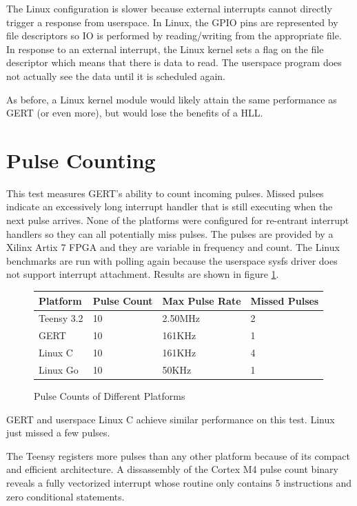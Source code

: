 The Linux configuration is slower because external interrupts cannot directly trigger a response
from userspace. In Linux, the GPIO pins are represented by file descriptors so
IO is performed by reading/writing from the appropriate file. In response to an external interrupt,
the Linux kernel sets a flag on the file descriptor which means that there is data to read. The userspace
program does not actually see the data until it is scheduled again.

As before, a Linux kernel module would likely attain the same performance as GERT
(or even more), but would lose the benefits of a HLL.


\section{Pulse Counting}\label{sec:pulse_count}
This test measures GERT's ability to count incoming pulses. Missed pulses
indicate an excessively long interrupt handler that is still executing when the next
pulse arrives. None of the platforms were configured for re-entrant interrupt handlers
so they can all potentially miss pulses.
The pulses are provided by a Xilinx Artix 7 FPGA and they are variable in
frequency and count. The Linux benchmarks are run with polling again because the
userspace sysfs driver does not support interrupt attachment.
Results are shown in figure \ref{fig:counter}.


\begin{figure} [h]
\begin{center}
  \begin{tabular}{ | l | l | l | l |}
    \hline
    Platform & Pulse Count & Max Pulse Rate & Missed Pulses \\ \hline
    Teensy 3.2 & 10 & 2.50MHz & 2 \\ \hline
    GERT & 10 & 161KHz & 1 \\ \hline
    Linux C & 10 & 161KHz & 4 \\ \hline
    Linux Go & 10 & 50KHz & 1 \\
    \hline
  \end{tabular}
\end{center}
  \caption{Pulse Counts of Different Platforms}  \label{fig:counter}
\end{figure}

GERT and userspace Linux C achieve similar performance on this test.
Linux just missed a few pulses.

The Teensy registers more pulses than any other platform because of its
compact and efficient architecture. A dissassembly of the Cortex M4 pulse count binary
reveals a fully vectorized interrupt whose routine only contains 5
instructions and zero conditional statements.

